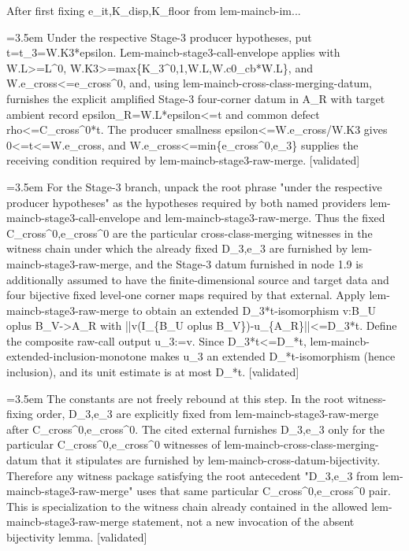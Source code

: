 \documentclass{article}
\newcommand{\step}[1]{\par\noindent\hangindent=3.5em\hangafter=1%
  \makebox[3.5em][l]{\textbf{#1.}}}
\newcommand{\steptag}[1]{\hfill{\small\textsf{[#1]}}}
\begin{document}
\begin{proofbox}{After first fixing e\_it,K\_disp,K\_floor from lem-maincb-im...}
\step{1.9} Under the respective Stage-3 producer hypotheses, put t=t\_3=W.K3*epsilon. Lem-maincb-stage3-call-envelope applies with W.L>=L\textasciicircum{}0, W.K3>=max\{K\_3\textasciicircum{}0,1,W.L,W.c0\_cb*W.L\}, and W.e\_cross<=e\_cross\textasciicircum{}0, and, using lem-maincb-cross-class-merging-datum, furnishes the explicit amplified Stage-3 four-corner datum in A\_R with target ambient record epsilon\_R=W.L*epsilon<=t and common defect rho<=C\_cross\textasciicircum{}0*t. The producer smallness epsilon<=W.e\_cross/W.K3 gives 0<=t<=W.e\_cross, and W.e\_cross<=min\{e\_cross\textasciicircum{}0,e\_3\} supplies the receiving condition required by lem-maincb-stage3-raw-merge. \steptag{validated} \\[4pt]
\step{1.10} For the Stage-3 branch, unpack the root phrase "under the respective producer hypotheses" as the hypotheses required by both named providers lem-maincb-stage3-call-envelope and lem-maincb-stage3-raw-merge. Thus the fixed C\_cross\textasciicircum{}0,e\_cross\textasciicircum{}0 are the particular cross-class-merging witnesses in the witness chain under which the already fixed D\_3,e\_3 are furnished by lem-maincb-stage3-raw-merge, and the Stage-3 datum furnished in node 1.9 is additionally assumed to have the finite-dimensional source and target data and four bijective fixed level-one corner maps required by that external. Apply lem-maincb-stage3-raw-merge to obtain an extended D\_3*t-isomorphism v:B\_U oplus B\_V->A\_R with ||v(I\_\{B\_U oplus B\_V\})-u\_\{A\_R\}||<=D\_3*t. Define the composite raw-call output u\_3:=v. Since D\_3*t<=D\_*t, lem-maincb-extended-inclusion-monotone makes u\_3 an extended D\_*t-isomorphism (hence inclusion), and its unit estimate is at most D\_*t. \steptag{validated} \\[6pt]
\step{1.10.1} The constants are not freely rebound at this step. In the root witness-fixing order, D\_3,e\_3 are explicitly fixed from lem-maincb-stage3-raw-merge after C\_cross\textasciicircum{}0,e\_cross\textasciicircum{}0. The cited external furnishes D\_3,e\_3 only for the particular C\_cross\textasciicircum{}0,e\_cross\textasciicircum{}0 witnesses of lem-maincb-cross-class-merging-datum that it stipulates are furnished by lem-maincb-cross-datum-bijectivity. Therefore any witness package satisfying the root antecedent "D\_3,e\_3 from lem-maincb-stage3-raw-merge" uses that same particular C\_cross\textasciicircum{}0,e\_cross\textasciicircum{}0 pair. This is specialization to the witness chain already contained in the allowed lem-maincb-stage3-raw-merge statement, not a new invocation of the absent bijectivity lemma. \steptag{validated} \\[4pt]

\end{proofbox}
\end{document}

